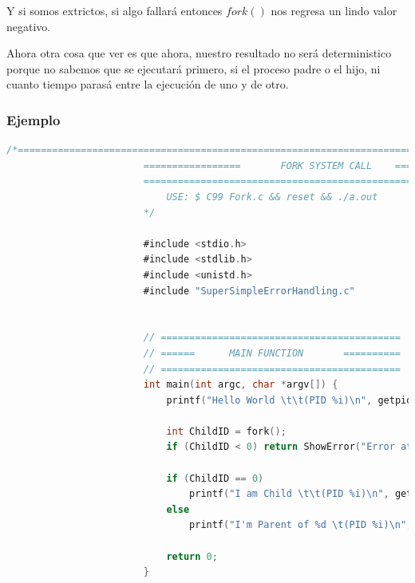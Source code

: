 \documentclass[12pt, fleqn]{report}                             %
\begin{document}
                Y si somos extrictos, si algo fallará entonces $fork()$ nos regresa
                un lindo valor negativo.

                Ahora otra cosa que ver es que ahora, nuestro resultado no será deterministico
                porque no sabemos que se ejecutará primero, si el proceso padre o el hijo, 
                ni cuanto tiempo parasá entre la ejecución de uno y de otro.

                \subsubsection{Ejemplo}
                    \begin{lstlisting}[language=C, gobble=24]
                        /*=======================================================================
                        =================       FORK SYSTEM CALL    =============================
                        =========================================================================
                            USE: $ C99 Fork.c && reset && ./a.out
                        */

                        #include <stdio.h>                                                  //We will need this
                        #include <stdlib.h>                                                 //We will need this        
                        #include <unistd.h>                                                 //We will need this        
                        #include "SuperSimpleErrorHandling.c"                               //My simple code :p


                        // ==========================================
                        // ======      MAIN FUNCTION       ==========
                        // ==========================================
                        int main(int argc, char *argv[]) {                                  //This is fucking main
                            printf("Hello World \t\t(PID %i)\n", getpid());                 //Show me your ID
                            
                            int ChildID = fork();                                           //Now create a new process
                            if (ChildID < 0) return ShowError("Error at Fork", 1);          //Go an show it

                            if (ChildID == 0)                                               //YOU ARE THE CHILD?
                                printf("I am Child \t\t(PID %i)\n", getpid());              //Show me your ID then kid
                            else                                                            //YOU ARE THE PARENT
                                printf("I'm Parent of %d \t(PID %i)\n", ChildID, getpid()); //Show me your ID then old man

                            return 0;
                        }
                    \end{lstlisting}
\end{document}
